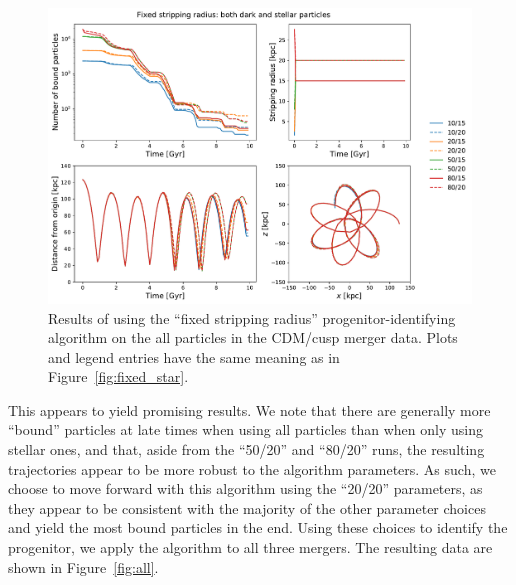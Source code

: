 \begin{figure}
    \centering
    \includegraphics[width=0.9\linewidth]{figs/fixed_both.pdf}
    \caption{%
        Results of using the ``fixed stripping radius'' progenitor-identifying
        algorithm on the all particles in the CDM/cusp merger data. Plots and
        legend entries have the same meaning as in
        Figure~\ref{fig:fixed_star}.
    }
    \label{fig:fixed_both}
\end{figure}

This appears to yield promising results. We note that there are generally more
``bound'' particles at late times when using all particles than when only using
stellar ones, and that, aside from the ``50/20'' and ``80/20'' runs, the
resulting trajectories appear to be more robust to the algorithm parameters. As
such, we choose to move forward with this algorithm using the ``20/20''
parameters, as they appear to be consistent with the majority of the other
parameter choices and yield the most bound particles in the end. Using these
choices to identify the progenitor, we apply the algorithm to all three mergers.
The resulting data are shown in Figure~\ref{fig:all}.

